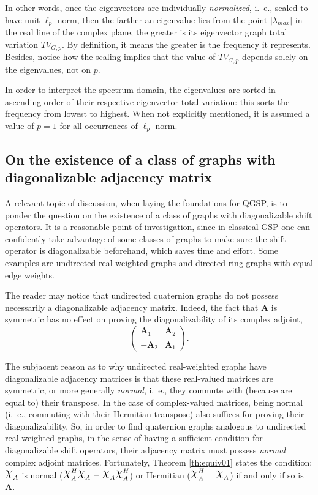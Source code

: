 In other words, once the eigenvectors are individually \textit{normalized}, i.~e., scaled to have unit $\ell_p$-norm, then the farther an eigenvalue lies from the point $|\lambda_{max}|$ in the real line of the complex plane, the greater is its eigenvector graph total variation $TV_{G, p}$. By definition, it means the greater is the frequency it represents. Besides, notice how the scaling implies that the value of $TV_{G, p}$ depends solely on the eigenvalues, not on $p$.

In order to interpret the spectrum domain, the eigenvalues are sorted in ascending order of their respective eigenvector total variation: this sorts the frequency from lowest to highest. When not explicitly mentioned, it is assumed a value of $p = 1$ for all occurrences of $\ell_p$-norm.

\subsection{On the existence of a class of graphs with diagonalizable adjacency matrix}

A relevant topic of discussion, when laying the foundations for QGSP, is to ponder the question on the existence of a class of graphs with diagonalizable shift operators. It is a reasonable point of investigation, since in classical GSP one can confidently take advantage of some classes of graphs to make sure the shift operator is diagonalizable beforehand, which saves time and effort. Some examples are undirected real-weighted graphs and directed ring graphs with equal edge weights.

The reader may notice that undirected quaternion graphs do not possess necessarily a diagonalizable adjacency matrix. Indeed, the fact that $\mathbf{A}$ is symmetric has no effect on proving the diagonalizability of its complex adjoint,
\begin{equation}
\begin{pmatrix}
\mathbf{A}_1 & \mathbf{A}_2\\ 
- \overline{\mathbf{A}}_2 & \overline{\mathbf{A}}_1
\end{pmatrix}.
\end{equation}

The subjacent reason as to why undirected real-weighted graphs have diagonalizable adjacency matrices is that these real-valued matrices are symmetric, or more generally \textit{normal}, i.~e., they commute with (because are equal to) their transpose. In the case of complex-valued matrices, being normal (i.~e., commuting with their Hermitian transpose) also suffices for proving their diagonalizability. So, in order to find quaternion graphs analogous to undirected real-weighted graphs, in the sense of having a sufficient condition for diagonalizable shift operators, their adjacency matrix must possess \textit{normal} complex adjoint matrices. Fortunately, Theorem \ref{th:equiv01} states the condition:
 $ \rchi_{A}$ is normal ($ \rchi_{A}^H \rchi_{A} = \rchi_{A} \rchi_{A}^H $) or Hermitian ($\rchi_{A}^H = \rchi_{A}$) if and only if so is $ \mathbf{A}$.
 
